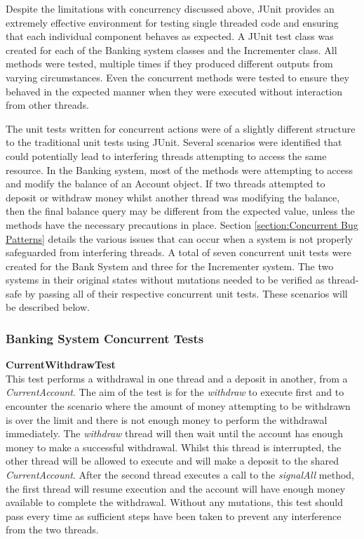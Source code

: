 \documentclass[a4paper,12pt]{article}
\begin{document}
Despite the limitations with concurrency discussed above, JUnit provides an extremely effective environment for testing single threaded code and ensuring that each individual component behaves as expected. A JUnit test class was created for each of the Banking system classes and the Incrementer class. All methods were tested, multiple times if they produced different outputs from varying circumstances. Even the concurrent methods were tested to ensure they behaved in the expected manner when they were executed without interaction from other threads. 

The unit tests written for concurrent actions were of a slightly different structure to the traditional unit tests using JUnit. Several scenarios were identified that could potentially lead to interfering threads attempting to access the same resource. In the Banking system, most of the methods were attempting to access and modify the balance of an Account object. If two threads attempted to deposit or withdraw money whilst another thread was modifying the balance, then the final balance query may be different from the expected value, unless the methods have the necessary precautions in place. Section \ref{section:Concurrent Bug Patterns} details the various issues that can occur when a system is not properly safeguarded from interfering threads. A total of seven concurrent unit tests were created for the Bank System and three for the Incrementer system. The two systems in their original states without mutations needed to be verified as thread-safe by passing all of their respective concurrent unit tests. These scenarios will be described below.   

\subsubsection{Banking System Concurrent Tests}

\textbf{CurrentWithdrawTest}
\\This test performs a withdrawal in one thread and a deposit in another, from a \textit{CurrentAccount}. The aim of the test is for the \textit{withdraw} to execute first and to encounter the scenario where the amount of money attempting to be withdrawn is over the limit and there is not enough money to perform the withdrawal immediately. The \textit{withdraw} thread will then wait until the account has enough money to make a successful withdrawal. Whilst this thread is interrupted, the other thread will be allowed to execute and will make a deposit to the shared \textit{CurrentAccount}. After the second thread executes a call to the \textit{signalAll} method, the first thread will resume execution and the account will have enough money available to complete the withdrawal. Without any mutations, this test should pass every time as sufficient steps have been taken to prevent any interference from the two threads.  
\end{document}

